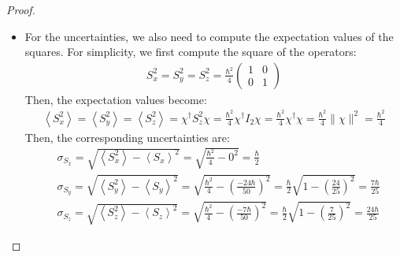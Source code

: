 \documentclass{article}
\begin{document}
\begin{proof}
\begin{itemize}
        \item[(c)] For the uncertainties, we also need to compute the expectation values of the squares. For simplicity, we first compute the square of the operators:
        \begin{align}
            S_x^2= S_y^2=S_z^2 = \frac{\hbar^2}{4}\begin{pmatrix}
                1&0\\0&1
            \end{pmatrix}
        \end{align}
        Then, the expectation values become:
        \begin{align}
            \left<S_x^2\right>=\left<S_y^2\right>=\left<S_z^2\right>=\chi^\dagger S_z^2\chi = \frac{\hbar^2}{4}\chi^\dagger I_2\chi = \frac{\hbar^2}{4}\chi^\dagger\chi = \frac{\hbar^2}{4}\|\chi\|^2 = \frac{\hbar^2}{4}
        \end{align}
        Then, the corresponding uncertainties are:
        \begin{align}
            &\sigma_{S_x} = \sqrt{\left<S_x^2\right>-\left<S_x\right>^2} = \sqrt{\frac{\hbar^2}{4}-0^2} = \frac{\hbar}{2}\\
            &\sigma_{S_y} = \sqrt{\left<S_y^2\right>-\left<S_y\right>^2} = \sqrt{\frac{\hbar^2}{4}-\left(\frac{-24\hbar}{50}\right)^2} = \frac{\hbar}{2}\sqrt{1-\left(\frac{24}{25}\right)^2} = \frac{7\hbar}{25}\\
            &\sigma_{S_z} = \sqrt{\left<S_z^2\right>-\left<S_z\right>^2} = \sqrt{\frac{\hbar^2}{4}-\left(\frac{-7\hbar}{50}\right)^2} = \frac{\hbar}{2}\sqrt{1-\left(\frac{7}{25}\right)^2} = \frac{24\hbar}{25}
        \end{align}
        
        \hfil


\end{itemize}
\end{proof}
\end{document}

